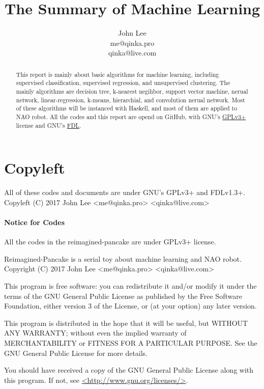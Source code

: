 \documentclass{article}
\title{The Summary of Machine Learning}
\author{John Lee \\  me@qinka.pro \\ qinka@live.com}
\begin{document}
\maketitle
\begin{abstract}
  This report is mainly about basic algorithms for machine learning,
  including supervised classification, supervised regression, and unsupervised clustering.
  The mainly algorithms are decision tree, k-nearest negihbor, support vector machine, nerual network,
  linear-regression, k-means, hierarchial, and convolution nerual network.
  Most of these algorithms will be instanced with Haskell, and most of them are applied to NAO robot.
  All the codes and this report are opend on GitHub, with GNU's
  \href{https://www.gnu.org/copyleft/gpl.html}{GPLv3+} license and GNU's
  \href{https://www.gnu.org/licenses/quick-guide-gplv3.html}{FDL}.
\end{abstract}
\section*{Copyleft}
\label{sec:copyleft}

All of these codes and documents are under GNU's GPLv3+ and FDLv1.3+. \\
{\large Copyleft (C) 2017 John Lee <me@qinka.pro> <qinka@live.com>} \\

\paragraph{Notice for Codes}

All the codes in the reimagined-pancake are under GPLv3+ license.

Reimagined-Pancake is a serial toy about machine learning and NAO robot.
Copyright (C) 2017 John Lee <me@qinka.pro> <qinka@live.com>

This program is free software: you can redistribute it and/or modify
it under the terms of the GNU General Public License as published by
the Free Software Foundation, either version 3 of the License, or
(at your option) any later version.

This program is distributed in the hope that it will be useful,
but WITHOUT ANY WARRANTY; without even the implied warranty of
MERCHANTABILITY or FITNESS FOR A PARTICULAR PURPOSE.  See the
GNU General Public License for more details.

You should have received a copy of the GNU General Public License
along with this program.  If not, see \href{http://www.gnu.org/licenses}{<http://www.gnu.org/licenses/>}.
\end{document}
